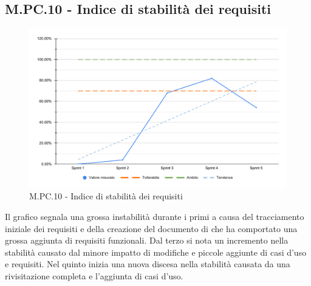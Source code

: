 \subsection{M.PC.10 - Indice di stabilità dei requisiti}
\begin{figure}[H]
    \centering
    \includegraphics[width=\textwidth]{assets/stabilita_requisiti.pdf}
    \caption{M.PC.10 - Indice di stabilità dei requisiti}
\end{figure}

\par Il grafico segnala una grossa instabilità durante i primi  a causa del tracciamento iniziale dei requisiti e della creazione del documento di \AdR che ha comportato una grossa aggiunta di requisiti funzionali. Dal terzo  si nota un incremento nella stabilità causato dal minore impatto di modifiche e piccole aggiunte di casi d'uso e requisiti. Nel quinto  inizia una nuova discesa nella stabilità causata da una rivisitazione completa e l'aggiunta di casi d'uso.